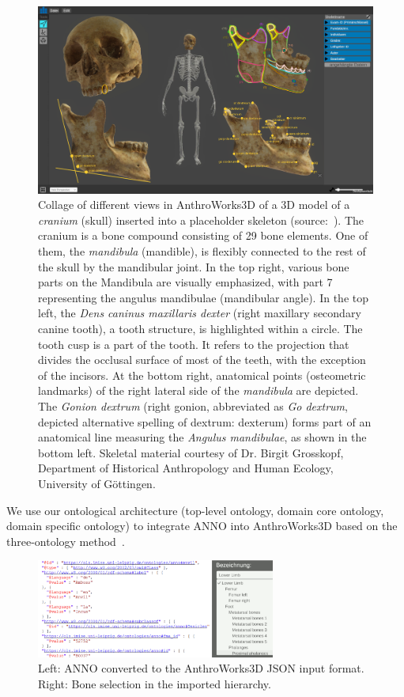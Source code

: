 \documentclass[sw]{iosart2x}
\newcommand{\aw}{AnthroWorks3D}
\newcommand{\latin}[1]{\emph{#1}}
\begin{document}
\begin{figure}[h]
\includegraphics[width=\textwidth]{img/aw3d.png}
\caption{
Collage of different views in \aw{} of a 3D model of a \latin{cranium} (skull) inserted into a placeholder skeleton (source:~\cite{aw3dcidoc}).
The cranium is a bone compound consisting of 29 bone elements.
One of them, the \latin{mandibula} (mandible), is flexibly connected to the rest of the skull by the mandibular joint.
In the top right, various bone parts on the Mandibula are visually emphasized, with part 7 representing the angulus mandibulae (mandibular angle).
In the top left, the \latin{Dens caninus maxillaris dexter} (right maxillary secondary canine tooth), a tooth structure, is highlighted within a circle.
The tooth cusp is a part of the tooth.
It refers to the projection that divides the occlusal surface of most of the teeth, with the exception of the incisors.
At the bottom right, anatomical points (osteometric landmarks) of the right lateral side of the \latin{mandibula} are depicted.
The \latin{Gonion dextrum} (right gonion, abbreviated as \latin{Go dextrum}, depicted alternative spelling of dextrum: dexterum) forms part of an anatomical line measuring the \latin{Angulus mandibulae},
as shown in the bottom left.
Skeletal material courtesy of Dr. Birgit Grosskopf, Department of Historical Anthropology and Human Ecology, University of Göttingen.
}
\label{fig:aw}
\end{figure}

We use our ontological architecture (top-level ontology, domain core ontology, domain specific ontology) to integrate ANNO into \aw{} based on the three-ontology method~\cite{threeontologymethod}.

\begin{figure}[h]
\includegraphics[width=0.7\textwidth]{img/json.png}
\caption{Left: ANNO converted to the \aw{} JSON input format. Right: Bone selection in the imported hierarchy.}
\label{fig:json}
\end{figure}
\end{document}
